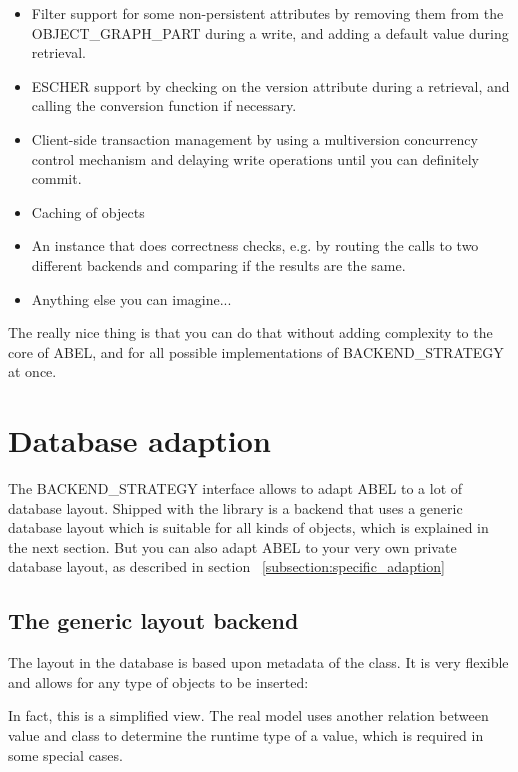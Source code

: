 \begin{itemize}
 \item Filter support for some non-persistent attributes by removing them from the OBJECT\_GRAPH\_PART during a write, and adding a default value during retrieval.
 \item ESCHER support by checking on the version attribute during a retrieval, and calling the conversion function if necessary.
 \item Client-side transaction management by using a multiversion concurrency control mechanism and delaying write operations until you can definitely commit.
 \item Caching of objects
 \item An instance that does correctness checks, e.g. by routing the calls to two different backends and comparing if the results are the same.
 \item Anything else you can imagine...
\end{itemize}

The really nice thing is that you can do that without adding complexity to the core of ABEL, and for all possible implementations of BACKEND\_STRATEGY at once.


\section{Database adaption}

The BACKEND\_STRATEGY interface allows to adapt ABEL to a lot of database layout.
Shipped with the library is a backend that uses a generic database layout which is suitable for all kinds of objects, which is explained in the next section.
But you can also adapt ABEL to your very own private database layout, as described in section ~\ref{subsection:specific_adaption}

\subsection{The generic layout backend}

The layout in the database is based upon metadata of the class. It is very flexible and allows for any type of objects to be inserted:


In fact, this is a simplified view. 
The real model uses another relation between value and class to determine the runtime type of a value, which is required in some special cases.

